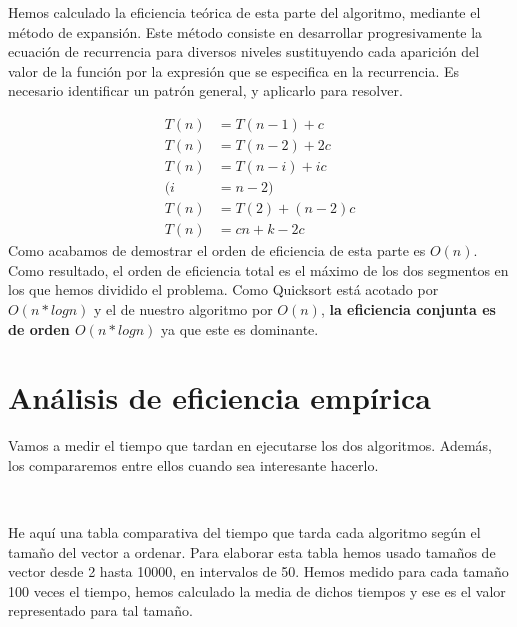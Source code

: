 \documentclass{article}
\begin{document}
	Hemos calculado la eficiencia teórica de esta parte del algoritmo, mediante el método de expansión. Este método  consiste en desarrollar progresivamente la ecuación de recurrencia para diversos niveles sustituyendo cada aparición del valor de la función por la expresión que se especifica en la recurrencia. Es necesario identificar un patrón general, y aplicarlo para resolver.
	

\begin{align*}
	T(n) &= T(n-1) + c \\
	T(n) &= T(n-2) + 2c \\
	T(n) &= T(n-i) + ic \\
		(i &= n - 2) \\
	T(n) &= T(2) + (n-2)c \\
	T(n) &= cn + k - 2c
\end{align*}
Como acabamos de demostrar el orden de eficiencia de esta parte es $O(n)$.
	Como resultado, el orden de eficiencia total es el máximo de los dos segmentos en los que hemos dividido el problema. Como Quicksort está acotado por $O(n*log n)$ y el de
nuestro algoritmo por $O(n)$, \textbf{la eficiencia conjunta es de orden $O(n*log n)$} ya que este es 
dominante.
	\section{Análisis de eficiencia empírica}
	Vamos a medir el tiempo que tardan en ejecutarse los dos algoritmos.	Además, los compararemos entre ellos cuando sea interesante hacerlo.
	
	
	\
	
	He aquí una tabla comparativa del tiempo que tarda cada algoritmo según el tamaño del vector a ordenar. Para elaborar esta tabla hemos usado tamaños de vector desde 2 hasta 10000, en intervalos de 50. Hemos medido para cada tamaño 100 veces el tiempo, hemos calculado la media de dichos tiempos y ese es el valor representado para tal tamaño.
	
\end{document}
